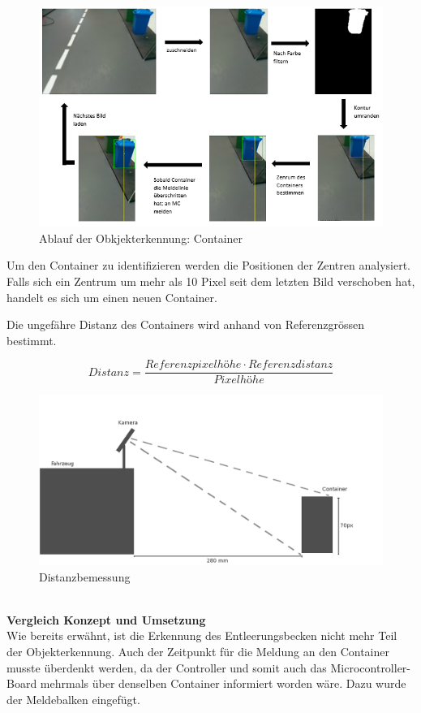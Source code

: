 \begin{figure}[H]%
\centering
\includegraphics[width=1\textwidth]{03_Loesungskonzept/pictures/uebersicht_object.PNG}
\caption{Ablauf der Obkjekterkennung: Container}
\label{fig:objectDetectionOverview}
\end{figure}
Um den Container zu identifizieren werden die Positionen der Zentren analysiert. Falls sich ein Zentrum um mehr als 10 Pixel seit dem letzten Bild verschoben hat, handelt es sich um einen neuen Container.

Die ungefähre Distanz des Containers wird anhand von Referenzgrössen bestimmt.

\[
Distanz = \frac{Referenzpixelhöhe\cdot Referenzdistanz}{Pixelhöhe}
\]
\begin{figure}[H]%
\centering
\includegraphics[width=1\textwidth]{03_Loesungskonzept/pictures/distance_reference.png}
\caption{Distanzbemessung}
\label{fig:distanceCalculation}
\end{figure}
\\[0.2cm]
\textbf{Vergleich Konzept und Umsetzung}\\[0.2cm]
Wie bereits erwähnt, ist die Erkennung des Entleerungsbecken nicht mehr Teil der Objekterkennung. Auch der Zeitpunkt für die Meldung an den Container musste überdenkt werden, da der Controller und somit auch das Microcontroller-Board mehrmals über denselben Container informiert worden wäre. Dazu wurde der Meldebalken eingefügt.

